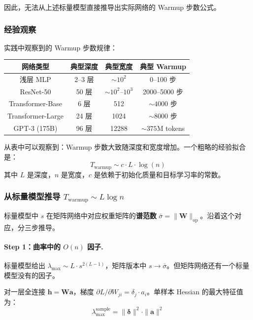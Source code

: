 \documentclass[12pt, a4paper]{ctexart}
\begin{document}
因此，无法从上述标量模型直接推导出实际网络的 Warmup 步数公式。

\subsubsection{经验观察}

实践中观察到的 Warmup 步数规律：

\begin{center}
\begin{tabular}{c|ccc}
网络类型 & 典型深度 & 典型宽度 & 典型 Warmup \\
\hline
浅层 MLP & 2--3 层 & $\sim 10^2$ & 0--100 步 \\
ResNet-50 & 50 层 & $\sim 10^2$--$10^3$ & 2000--5000 步 \\
Transformer-Base & 6 层 & 512 & $\sim 4000$ 步 \\
Transformer-Large & 24 层 & 1024 & $\sim 8000$ 步 \\
GPT-3 (175B) & 96 层 & 12288 & $\sim 375$M tokens \\
\end{tabular}
\end{center}

从表中可以观察到：Warmup 步数大致随深度和宽度增加。一个粗略的经验拟合是：
\begin{equation}
    T_{\text{warmup}} \sim c \cdot L \cdot \log(n)
\end{equation}
其中 $L$ 是深度，$n$ 是宽度，$c$ 是依赖于初始化质量和目标学习率的常数。

\subsubsection{从标量模型推导 $T_{\text{warmup}} \sim L\log n$}

标量模型中 $s$ 在矩阵网络中对应权重矩阵的\textbf{谱范数} $\bar{\sigma} = \|\mathbf{W}\|_{\text{op}}$。沿着这个对应，分三步推导。

\paragraph{Step 1：曲率中的 $O(n)$ 因子.}

标量模型给出 $\lambda_{\max} \sim L \cdot s^{2(L-1)}$，矩阵版本中 $s \to \bar{\sigma}$。但矩阵网络还有一个标量模型没有的因子。

对一层全连接 $\mathbf{h} = \mathbf{W}\mathbf{a}$，梯度 $\partial L/\partial W_{ji} = \delta_j \cdot a_i$。单样本 Hessian 的最大特征值为：
\begin{equation}
    \lambda_{\max}^{\text{sample}} = \|\boldsymbol{\delta}\|^2 \cdot \|\mathbf{a}\|^2
\end{equation}
\end{document}
